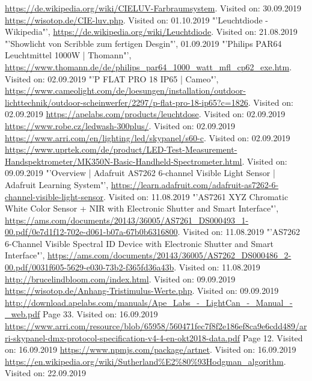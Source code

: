 \documentclass[11pt]{scrartcl}
\begin{document}
\begin{thebibliography}{xxxxxxxxxxxxxxxxxxx}
     \url{https://de.wikipedia.org/wiki/CIELUV-Farbraumsystem}. Visited on: 30.09.2019
     \url{https://wisotop.de/CIE-luv.php}. Visited on: 01.10.2019
    "'Leuchtdiode - Wikipedia"', \url{https://de.wikipedia.org/wiki/Leuchtdiode}. Visited on: 21.08.2019
    "'Showlicht von Scribble zum fertigen Desgin"', 01.09.2019
    "'Philips PAR64 Leuchtmittel 1000W | Thomann"', \url{https://www.thomann.de/de/philips_par64_1000_watt_mfl_cp62_exe.htm}. Visited on: 02.09.2019
    "'P FLAT PRO 18 IP65 | Cameo"', \url{https://www.cameolight.com/de/loesungen/installation/outdoor-lichttechnik/outdoor-scheinwerfer/2297/p-flat-pro-18-ip65?c=1826}. Visited on: 02.09.2019
     \url{https://apelabs.com/products/leuchtdose}. Visited on: 02.09.2019
     \url{https://www.robe.cz/ledwash-300plus/}. Visited on: 02.09.2019
     \url{https://www.arri.com/en/lighting/led/skypanel/s60-c}. Visited on: 02.09.2019
     \url{https://www.uprtek.com/de/product/LED-Test-Measurement-Handspektrometer/MK350N-Basic-Handheld-Spectrometer.html}. Visited on: 09.09.2019
    "'Overview | Adafruit AS7262 6-channel Visible Light Sensor | Adafruit Learning System"', \url{https://learn.adafruit.com/adafruit-as7262-6-channel-visible-light-sensor}. Visited on: 11.08.2019
    "'AS7261 XYZ Chromatic White Color Sensor + NIR with Electronic Shutter and Smart Interface"', \url{https://ams.com/documents/20143/36005/AS7261_DS000493_1-00.pdf/0e7d1f12-702e-d061-b07a-67b0b6316800}. Visited on: 11.08.2019
    "'AS7262 6-Channel Visible Spectral ID Device with Electronic Shutter and Smart Interface"', \url{https://ams.com/documents/20143/36005/AS7262_DS000486_2-00.pdf/0031f605-5629-e030-73b2-f365fd36a43b}. Visited on: 11.08.2019
     \url{http://brucelindbloom.com/index.html}. Visited on: 09.09.2019
     \url{https://wisotop.de/Anhang-Tristimulus-Werte.php}. Visited on: 09.09.2019
     \url{http://download.apelabs.com/manuals/Ape_Labs_-_LightCan_-_Manual_-_web.pdf} Page 33. Visited on: 16.09.2019
     \url{https://www.arri.com/resource/blob/65958/560471fec7f8f2e186ef8ca9e6cdd489/arri-skypanel-dmx-protocol-specification-v4-4-en-okt2018-data.pdf} Page 12. Visited on: 16.09.2019
     \url{https://www.npmjs.com/package/artnet}. Visited on: 16.09.2019
     \url{https://en.wikipedia.org/wiki/Sutherland%E2%80%93Hodgman_algorithm}. Visited on: 22.09.2019
\end{thebibliography}
\endgroup
\clearpage
\end{document}
